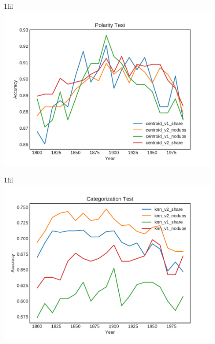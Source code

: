 \documentclass{article}
\makeatletter
\newcommand*{\centerfloat}{%
  \parindent \z@
  \leftskip \z@ \@plus 1fil \@minus \textwidth
  \rightskip\leftskip
  \parfillskip \z@skip}
\makeatother
\begin{document}
\begin{figure}[H]
    \centerfloat
    \includegraphics[width=1.3\linewidth]{../../plots-2/centroid/results_polarity_test.pdf}
\end{figure}

\begin{figure}[H]
    \centerfloat
    \includegraphics[width=1.3\linewidth]{../../plots-2/knn/results_categorization_test.pdf}
\end{figure}
\end{document}
